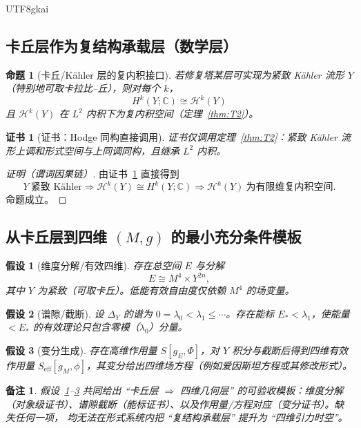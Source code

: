 \documentclass[12pt]{article}
\newtheorem{assumption}{假设}[section]
\newtheorem{proposition}{命题}[section]
\newtheorem{remark}{备注}[section]
\newtheorem{Certificate}{证书}[section]
\begin{document}
\begin{CJK*}{UTF8}{gkai}
\subsection{卡丘层作为复结构承载层（数学层）}

\begin{proposition}[卡丘/K\"ahler 层的复内积接口]
\label{prop:P3}
若修复塔某层可实现为紧致 K\"ahler 流形 $Y$（特别地可取卡拉比--丘），则对每个 $k$，
\[
H^k(Y;\mathbb C)\cong \mathcal H^k(Y)
\]
且 $\mathcal H^k(Y)$ 在 $L^2$ 内积下为复内积空间（定理~\ref{thm:T2}）。
\end{proposition}

\begin{Certificate}[证书：Hodge 同构直接调用]
\label{cert:P3}
证书仅调用定理~\ref{thm:T2}：紧致 K\"ahler 流形上调和形式空间与上同调同构，且继承 $L^2$ 内积。
\end{Certificate}

\begin{proof}[证明（谓词因果链）]
由证书~\ref{cert:P3} 直接得到
\[
Y\ \text{紧致 K\"ahler}
\Rightarrow
\mathcal H^k(Y)\cong H^k(Y;\mathbb C)
\Rightarrow
\mathcal H^k(Y)\ \text{为有限维复内积空间}.
\]
命题成立。
\end{proof}

\subsection{从卡丘层到四维 $(M,g)$ 的最小充分条件模板}

\begin{assumption}[维度分解/有效四维]
\label{ass:A1}
存在总空间 $E$ 与分解
\[
E\cong M^4\times Y^{2n},
\]
其中 $Y$ 为紧致（可取卡丘）。低能有效自由度仅依赖 $M^4$ 的场变量。
\end{assumption}

\begin{assumption}[谱隙/截断]
\label{ass:A2}
设 $\Delta_Y$ 的谱为 $0=\lambda_0<\lambda_1\le\cdots$。存在能标 $E_\ast<\lambda_1$，使能量 $<E_\ast$ 的有效理论只包含零模（$\lambda_0$）分量。
\end{assumption}

\begin{assumption}[变分生成]
\label{ass:A3}
存在高维作用量 $S[g_E,\Phi]$，对 $Y$ 积分与截断后得到四维有效作用量 $S_{\mathrm{eff}}[g_M,\phi]$，其变分给出四维场方程（例如爱因斯坦方程或其修改形式）。
\end{assumption}

\begin{remark}
\label{rem:template}
假设~\ref{ass:A1}--\ref{ass:A3} 共同给出 ``卡丘层 $\Rightarrow$ 四维几何层'' 的可验收模板：维度分解（对象级证书）、谱隙截断（能标证书）、以及作用量/方程对应（变分证书）。缺失任何一项，
  均无法在形式系统内把 ``复结构承载层'' 提升为 ``四维引力时空''。
\end{remark}


\end{CJK*}
\end{document}
